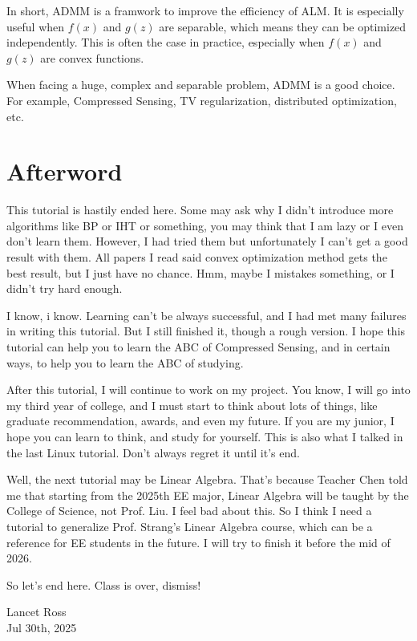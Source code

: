 \documentclass[12pt]{ctexart}
\begin{document}
In short, ADMM is a framwork to improve the efficiency of ALM. It is especially
useful when $f(x)$ and $g(z)$ are separable, which means they can be optimized
independently. This is often the case in practice, especially when $f(x)$ and
$g(z)$ are convex functions.

When facing a huge, complex and separable problem, ADMM is a good choice.
For example, Compressed Sensing, TV regularization, distributed optimization, etc.

\newpage
\section*{\textbf{Afterword}}

This tutorial is hastily ended here. Some may ask why I didn't introduce more
algorithms like BP or IHT or something, you may think that I am lazy or I even don't
learn them. However, I had tried them but unfortunately I can't get a good result with
them. All papers I read said convex optimization method gets the best result, but I just
have no chance. Hmm,  maybe I mistakes something, or I didn't try hard enough.

I know, i know. Learning can't be always successful, and I had met many failures
in writing this tutorial. But I still finished it, though a rough version. I hope
this tutorial can help you to learn the ABC of Compressed Sensing, and in certain ways,
to help you to learn the ABC of studying.

After this tutorial, I will continue to work on my project. You know, I will go into
my third year of college, and I must start to think about lots of things, like
graduate recommendation, awards, and even my future. If you are my junior, I hope
you can learn to think, and study for yourself. This is also what I talked in the
last Linux tutorial. Don't always regret it until it's end.

Well, the next tutorial may be Linear Algebra. That's because Teacher Chen told me
that starting from the 2025th EE major, Linear Algebra will be taught by the College
of Science, not Prof. Liu. I feel bad about this. So I think I need a tutorial to
generalize Prof. Strang's Linear Algebra course, which can be a reference for
EE students in the future. I will try to finish it before the mid of 2026.

So let's end here. Class is over, dismiss!

\begin{flushright}
  Lancet Ross\\
  Jul 30th, 2025
\end{flushright}
\end{document}
